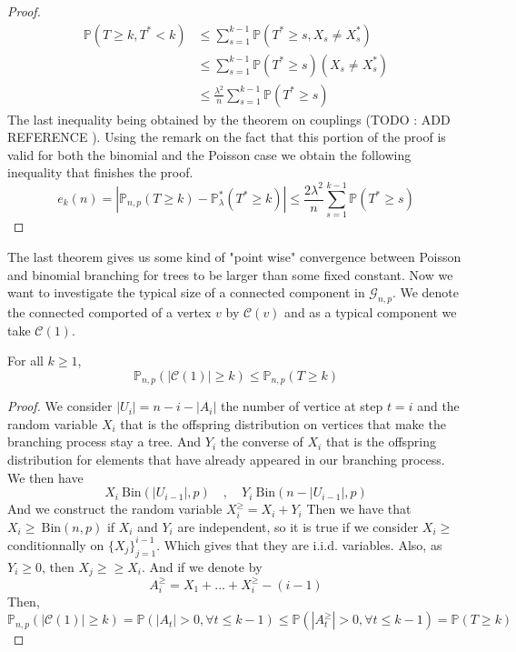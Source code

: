 \begin{proof}
	\begin{align}
		\mathbb{P}(T\geq k, T^* < k) &\leq \sum_{s=1}^{k-1} \mathbb{P}(T^* \geq s, X_s \neq X_s^*) 	\\
					     &\leq  \sum_{s=1}^{k-1} \mathbb{P}(T^* \geq s)(X_s \neq X_s^*) 	\\
					     &\leq  \frac{\lambda ^2}{n} \sum_{s=1}^{k-1} \mathbb{P}(T^* \geq s) 
	\end{align}
	The last inequality being obtained by the theorem on couplings (TODO : ADD REFERENCE ).
	Using the remark on the fact that this portion of the proof is valid for both the binomial and the Poisson case we obtain the following inequality that finishes the proof.
	\begin{equation}
		e_k(n) = |\mathbb{P}_{n, p}(T \geq k) -\mathbb{P}_{\lambda}^*(T^* \geq k)| \leq \frac{2\lambda ^2}{n}\sum_{s=1}^{k-1} \mathbb{P}(T^* \geq s)
	\end{equation}
\end{proof}
The last theorem gives us some kind of "point wise" convergence between Poisson and binomial branching for trees to be larger than some fixed constant.
\newline
Now we want to investigate the typical size of a connected component in $\mathcal{G}_{n,p}$. We denote the connected comported of a vertex $v$ by $\mathcal{C}(v)$ and as a typical component we take $\mathcal{C}(1)$.
\begin{theorem}
	For all $k\geq1$,
	\begin{equation}
		\mathbb{P}_{n,p}(|\mathcal{C}(1)| \geq k) \leq \mathbb{P}_{n,p}(T\geq k)
	\end{equation}
\end{theorem}
\begin{proof}
	We consider $|U_i| = n - i - |A_i|$ the number of vertice at step $t = i$ and the random variable $X_i$ that is the offspring distribution on vertices that make the branching process stay a tree.
	And $Y_i$ the converse of $X_i$ that is the offspring distribution for elements that have already appeared in our branching process. We then have
	\begin{equation}
		X_i ~ \text{Bin}(|U_{i-1}|, p) \quad, \quad Y_i ~ \text{Bin}(n-|U_{i-1}|, p)
	\end{equation}
	And we construct the random variable $X_i^{\geq} = X_i + Y_i$ Then we have that $X_i{\geq} ~ \text{Bin}(n, p)$ if $X_i$ and $Y_i$ are independent, so it is true if we consider $X_i{\geq}$ conditionnally on $\{X_j\}_{j=1}^{i-1}$. Which gives that they are i.i.d. variables.
	\newline
	Also, as $Y_i \geq 0$, then $X_j{\geq} \geq X_i$.
	And if we denote by 
	\begin{equation}
		A_i^{\geq} = X_1 + ... + X_i^{\geq} - (i-1)
	\end{equation}
	Then, 
	\begin{equation}
		\mathbb{P}_{n,p}(|\mathcal{C}(1)|\geq k) = \mathbb{P}(|A_t| > 0, \forall t \leq k-1) 
		\leq \mathbb{P}(|A_t^{\geq}| > 0, \forall t \leq k-1) = \mathbb{P}(T\geq k)
	\end{equation}
\end{proof}
